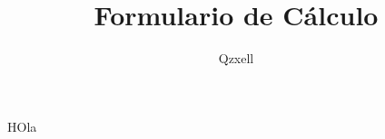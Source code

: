 \documentclass[11pt]{scrartcl}
\author{Qzxell}
\title{Formulario de C\'alculo}
\begin{document}
\maketitle
HOla
\end{document}

